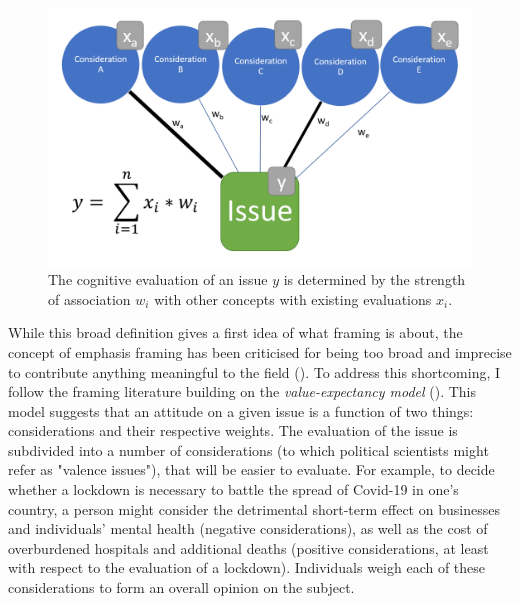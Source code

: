 \documentclass{article}
\begin{document}
\begin{figure}
    \centering
    \includegraphics[width=\textwidth]{paper/vis/CognitiveStorage.png}
    \caption{The cognitive evaluation of an issue $y$ is determined by the strength of association $w_i$ with other concepts with existing evaluations $x_i$.}
    \label{fig:cogStor}
\end{figure}

While this broad definition gives a first idea of what framing is about, the concept of emphasis framing has been criticised for being too broad and imprecise to contribute anything meaningful to the field (\cite{Scheufele2012}). To address this shortcoming, I follow the framing literature building on the \textit{value-expectancy model} (\cite{Ajzen2000, Nelson1997}). This model suggests that an attitude on a given issue is a function of two things: considerations and their respective weights. The evaluation of the issue is subdivided into a number of considerations (to which political scientists might refer as "valence issues"), that will be easier to evaluate. For example, to decide whether a lockdown is necessary to battle the spread of Covid-19 in one's country, a person might consider the detrimental short-term effect on businesses and individuals' mental health (negative considerations), as well as the cost of overburdened hospitals and additional deaths (positive considerations, at least with respect to the evaluation of a lockdown). Individuals weigh each of these considerations to form an overall opinion on the subject. 
\end{document}
